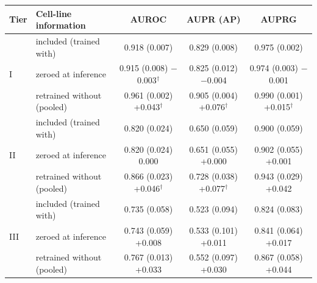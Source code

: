 \begin{tabular}{ll|ccc}
\hline
Tier & Cell-line information & AUROC & AUPR (AP) & AUPRG \\
\hline
\multirow{3}{*}{I} & included (trained with) & 0.918 (0.007) & 0.829 (0.008) & 0.975 (0.002) \\
 & zeroed at inference & 0.915 (0.008) {\scriptsize $-$0.003$^\dagger$} & 0.825 (0.012) {\scriptsize $-$0.004} & 0.974 (0.003) {\scriptsize $-$0.001} \\
 & retrained without (pooled) & 0.961 (0.002) {\scriptsize +0.043$^\dagger$} & 0.905 (0.004) {\scriptsize +0.076$^\dagger$} & 0.990 (0.001) {\scriptsize +0.015$^\dagger$} \\
\hline
\multirow{3}{*}{II} & included (trained with) & 0.820 (0.024) & 0.650 (0.059) & 0.900 (0.059) \\
 & zeroed at inference & 0.820 (0.024) {\scriptsize 0.000} & 0.651 (0.055) {\scriptsize +0.000} & 0.902 (0.055) {\scriptsize +0.001} \\
 & retrained without (pooled) & 0.866 (0.023) {\scriptsize +0.046$^\dagger$} & 0.728 (0.038) {\scriptsize +0.077$^\dagger$} & 0.943 (0.029) {\scriptsize +0.042} \\
\hline
\multirow{3}{*}{III} & included (trained with) & 0.735 (0.058) & 0.523 (0.094) & 0.824 (0.083) \\
 & zeroed at inference & 0.743 (0.059) {\scriptsize +0.008} & 0.533 (0.101) {\scriptsize +0.011} & 0.841 (0.064) {\scriptsize +0.017} \\
 & retrained without (pooled) & 0.767 (0.013) {\scriptsize +0.033} & 0.552 (0.097) {\scriptsize +0.030} & 0.867 (0.058) {\scriptsize +0.044} \\
\hline
\end{tabular}
